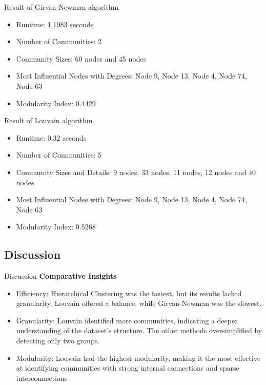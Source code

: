 \documentclass[compress]{beamer}
\begin{document}
\begin{frame}[t]{Result of Girvan-Newman algorithm}

 \begin{itemize}
 \item Runtime: 1.1983 seconds
 \item Number of Communities: 2
 \item Community Sizes: 60 nodes and 45 nodes
  \item Most Influential Nodes with Degrees: Node 9, Node 13, Node 4, Node 74, Node 63
 \item Modularity Index: 0.4429
 \end{itemize}
\end{frame}
\begin{frame}[t]{Result of Louvain algorithm}

 \begin{itemize}
 \item Runtime:  0.32 seconds
 \item Number of Communities: 5
 \item Community Sizes and Details: 9 nodes, 33 nodes, 11 nodes, 12 nodes and 40 nodes
   \item Most Influential Nodes with Degrees: Node 9, Node 13, Node 4, Node 74, Node 63
 \item Modularity Index: 0.5268
 \end{itemize}
\end{frame}
\subsection{Discussion}
\begin{frame}[t]{Discussion}
\textbf{Comparative Insights}
\begin{itemize}

  \item Efficiency: Hierarchical Clustering was the fastest, but its results lacked granularity.
 Louvain offered a balance, while Girvan-Newman was the slowest.
 \item Granularity: Louvain identified more communities, indicating a deeper understanding
 of the dataset’s structure. The other methods oversimplified by detecting only two
 groups.
 \item Modularity: Louvain had the highest modularity, making it the most effective at identifying communities with strong internal connections and sparse interconnections
 \end{itemize}
\end{frame}
\end{document}
